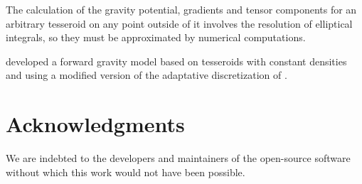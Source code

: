 \documentclass[extra]{gji}
\begin{document}
The calculation of the gravity potential, gradients and tensor components for an arbitrary tesseroid on any point outside of it involves the resolution of elliptical integrals, so they must be approximated by numerical computations. 

\citet{Uieda2016} developed a forward gravity model based on tesseroids with constant densities and using a modified version of the adaptative discretization of \citet{Li2011}. 

\section{Acknowledgments}

We are indebted to the developers and maintainers of the open-source
software without which this work would not have been possible.




\end{document}
